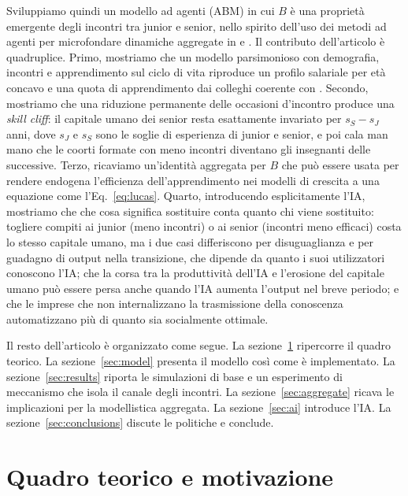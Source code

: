\documentclass[preprint,12pt,authoryear]{elsarticle}
\begin{document}
Sviluppiamo quindi un modello ad agenti (ABM) in cui $B$ è una proprietà emergente degli incontri tra junior e senior, nello spirito dell'uso dei metodi ad agenti per microfondare dinamiche aggregate in \citet{Bassi2022} e \citet{RailsbackGrimm2011}. Il contributo dell'articolo è quadruplice. Primo, mostriamo che un modello parsimonioso con demografia, incontri e apprendimento sul ciclo di vita riproduce un profilo salariale per età concavo e una quota di apprendimento dai colleghi coerente con \citet{Jarosch2021}. Secondo, mostriamo che una riduzione permanente delle occasioni d'incontro produce una \emph{skill cliff}: il capitale umano dei senior resta esattamente invariato per $s_S - s_J$ anni, dove $s_J$ e $s_S$ sono le soglie di esperienza di junior e senior, e poi cala man mano che le coorti formate con meno incontri diventano gli insegnanti delle successive. Terzo, ricaviamo un'identità aggregata per $B$ che può essere usata per rendere endogena l'efficienza dell'apprendimento nei modelli di crescita a una equazione come l'Eq.~\eqref{eq:lucas}. Quarto, introducendo esplicitamente l'IA, mostriamo che che cosa significa sostituire conta quanto chi viene sostituito: togliere compiti ai junior (meno incontri) o ai senior (incontri meno efficaci) costa lo stesso capitale umano, ma i due casi differiscono per disuguaglianza e per guadagno di output nella transizione, che dipende da quanto i suoi utilizzatori conoscono l'IA; che la corsa tra la produttività dell'IA e l'erosione del capitale umano può essere persa anche quando l'IA aumenta l'output nel breve periodo; e che le imprese che non internalizzano la trasmissione della conoscenza automatizzano più di quanto sia socialmente ottimale.

Il resto dell'articolo è organizzato come segue. La sezione~\ref{sec:background} ripercorre il quadro teorico. La sezione~\ref{sec:model} presenta il modello così come è implementato. La sezione~\ref{sec:results} riporta le simulazioni di base e un esperimento di meccanismo che isola il canale degli incontri. La sezione~\ref{sec:aggregate} ricava le implicazioni per la modellistica aggregata. La sezione~\ref{sec:ai} introduce l'IA. La sezione~\ref{sec:conclusions} discute le politiche e conclude.

\section{Quadro teorico e motivazione}\label{sec:background}
\end{document}
